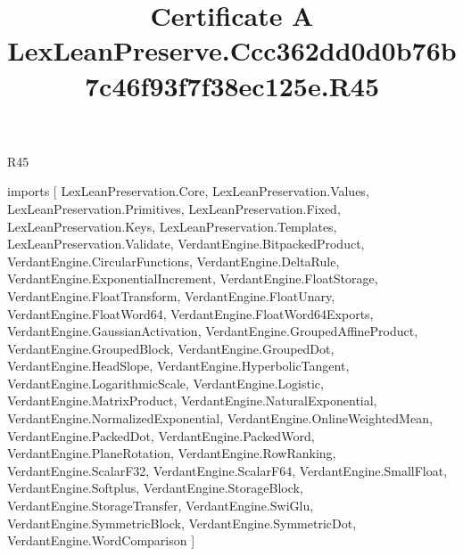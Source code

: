 \begin{lexlean}{R45}
\title{Certificate A LexLeanPreserve.Ccc362dd0d0b76b7c46f93f7f38ec125e.R45}
\begin{coremodule}
imports [
  LexLeanPreservation.Core,
  LexLeanPreservation.Values,
  LexLeanPreservation.Primitives,
  LexLeanPreservation.Fixed,
  LexLeanPreservation.Keys,
  LexLeanPreservation.Templates,
  LexLeanPreservation.Validate,
  VerdantEngine.BitpackedProduct,
  VerdantEngine.CircularFunctions,
  VerdantEngine.DeltaRule,
  VerdantEngine.ExponentialIncrement,
  VerdantEngine.FloatStorage,
  VerdantEngine.FloatTransform,
  VerdantEngine.FloatUnary,
  VerdantEngine.FloatWord64,
  VerdantEngine.FloatWord64Exports,
  VerdantEngine.GaussianActivation,
  VerdantEngine.GroupedAffineProduct,
  VerdantEngine.GroupedBlock,
  VerdantEngine.GroupedDot,
  VerdantEngine.HeadSlope,
  VerdantEngine.HyperbolicTangent,
  VerdantEngine.LogarithmicScale,
  VerdantEngine.Logistic,
  VerdantEngine.MatrixProduct,
  VerdantEngine.NaturalExponential,
  VerdantEngine.NormalizedExponential,
  VerdantEngine.OnlineWeightedMean,
  VerdantEngine.PackedDot,
  VerdantEngine.PackedWord,
  VerdantEngine.PlaneRotation,
  VerdantEngine.RowRanking,
  VerdantEngine.ScalarF32,
  VerdantEngine.ScalarF64,
  VerdantEngine.SmallFloat,
  VerdantEngine.Softplus,
  VerdantEngine.StorageBlock,
  VerdantEngine.StorageTransfer,
  VerdantEngine.SwiGlu,
  VerdantEngine.SymmetricBlock,
  VerdantEngine.SymmetricDot,
  VerdantEngine.WordComparison
]


\end{coremodule}
\end{lexlean}
